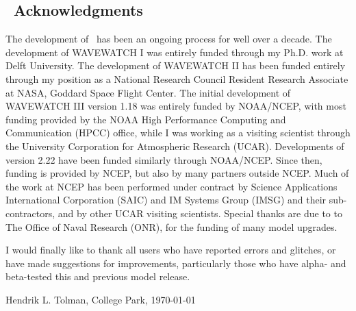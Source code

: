 \vssub
\subsection{~Acknowledgments}
\vssub

The development of \ws\ has been an ongoing process for well over a
decade. The development of WAVEWATCH I was entirely funded through my
Ph.D. work at Delft University. The development of WAVEWATCH II has been
funded entirely through my position as a National Research Council Resident
Research Associate at NASA, Goddard Space Flight Center. The initial
development of WAVEWATCH III version 1.18 was entirely funded by NOAA/NCEP,
with most funding provided by the NOAA High Performance Computing and
Communication (HPCC) office, while I was working as a visiting scientist
through the University Corporation for Atmospheric Research (UCAR).
Developments of version 2.22 have been funded similarly through
NOAA/NCEP. Since then, funding is provided by NCEP, but also by many partners
outside NCEP. Much of the work at NCEP has been performed under contract by
Science Applications International Corporation (SAIC) and IM Systems Group
(IMSG) and their sub-contractors, and by other UCAR visiting scientists.
Special thanks are due to to The Office of Naval Research (ONR), for the
funding of many model upgrades.

I would finally like to thank all users who have reported errors and glitches,
or have made suggestions for improvements, particularly those who have alpha-
and beta-tested this and previous model release.

\vspace{\baselineskip}
\vspace{\baselineskip} \strut \hfill Hendrik L. Tolman, College Park, \today
